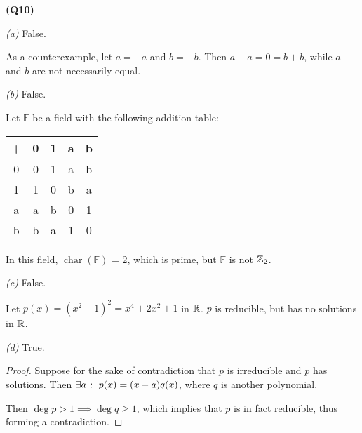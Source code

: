 \documentclass[12pt, a4paper]{article}
\newcommand{\F}{\mathbb{F}}
\begin{document}
\textbf{(Q10)}

\textit{(a)} False.

As a counterexample, let $a = -a$ and $b = -b$. Then $a + a = 0 = b + b$,
while $a$ and $b$ are not necessarily equal.

\textit{(b)} False.

Let $\F$ be a field with the following addition table:

\begin{center}
    \begin{tabular}{ |c|c|c|c|c| }
        \hline
        + & 0 & 1 & a & b \\
        \hline
        0 & 0 & 1 & a & b \\
        \hline
        1 & 1 & 0 & b & a \\
        \hline
        a & a & b & 0 & 1 \\
        \hline
        b & b & a & 1 & 0 \\
        \hline
    \end{tabular}
\end{center}

In this field, $\operatorname{char} (\F)$ = 2, which is prime, but $\F$ is not $\mathbb{Z}_2$.

\textit{(c)} False.

Let $p(x) = (x^2 + 1)^2 = x^4 + 2x^2 + 1$ in $\mathbb{R}$. $p$ is reducible, but has no solutions
in $\mathbb{R}$.

\textit{(d)} True.

\begin{proof}
    Suppose for the sake of contradiction that $p$ is irreducible
    and $p$ has solutions. Then $\exists a \; \colon \; p(x) = (x - a)q(x)$,
    where $q$ is another polynomial.

    Then $\deg p > 1 \implies \deg q \geq 1$,
    which implies that $p$ is in fact reducible, thus forming a contradiction.
\end{proof}
\end{document}

